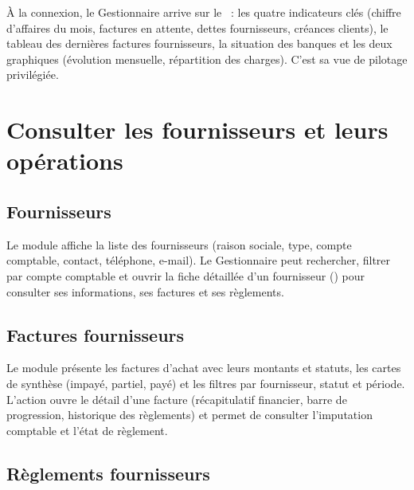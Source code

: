 À la connexion, le Gestionnaire arrive sur le ~: les quatre indicateurs clés (chiffre d'affaires du mois, factures en attente, dettes fournisseurs, créances clients), le tableau des dernières factures fournisseurs, la situation des banques et les deux graphiques (évolution mensuelle, répartition des charges). C'est sa vue de pilotage privilégiée.


\section{Consulter les fournisseurs et leurs opérations}

\subsection{Fournisseurs}

Le module  affiche la liste des fournisseurs (raison sociale, type, compte comptable, contact, téléphone, e-mail). Le Gestionnaire peut rechercher, filtrer par compte comptable et ouvrir la fiche détaillée d'un fournisseur () pour consulter ses informations, ses factures et ses règlements.


\subsection{Factures fournisseurs}

Le module  présente les factures d'achat avec leurs montants et statuts, les cartes de synthèse (impayé, partiel, payé) et les filtres par fournisseur, statut et période. L'action  ouvre le détail d'une facture (récapitulatif financier, barre de progression, historique des règlements) et permet de consulter l'imputation comptable et l'état de règlement.


\subsection{Règlements fournisseurs}

